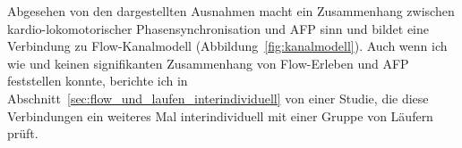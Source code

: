 Abgesehen von den dargestellten Ausnahmen macht ein Zusammenhang zwischen kardio-lokomotorischer Phasensynchronisation und \ac{AFP} sinn und bildet eine Verbindung zu Flow-Kanalmodell (Abbildung~\ref{fig:kanalmodell}). Auch wenn ich wie \citet{Stoll2005} und \citet{Reinhardt2006} keinen signifikanten Zusammenhang von Flow-Erleben und \ac{AFP} feststellen konnte, berichte ich in Abschnitt~\ref{sec:flow_und_laufen_interindividuell} von einer Studie, die diese Verbindungen ein weiteres Mal interindividuell mit einer Gruppe von Läufern prüft.

